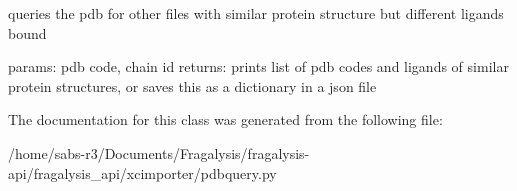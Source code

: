 \begin{DoxyVerb}queries the pdb for other files with similar protein structure but different ligands bound

params: pdb code, chain id
returns: prints list of pdb codes and ligands of similar protein structures, or saves this as a dictionary in a json file
\end{DoxyVerb}
 

The documentation for this class was generated from the following file\+:\begin{DoxyCompactItemize}
\item 
/home/sabs-\/r3/\+Documents/\+Fragalysis/fragalysis-\/api/fragalysis\+\_\+api/xcimporter/pdbquery.\+py\end{DoxyCompactItemize}

